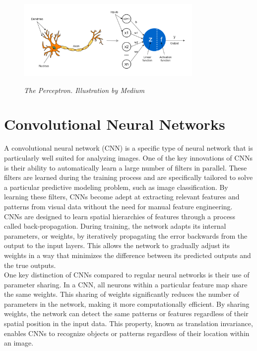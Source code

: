 \begin{figure}[H]
  \centering
  \includegraphics[width=0.8\textwidth]{imatges/preliminaries/perceptron.png}
  \caption[The Perceptron]{\textit{The Perceptron. Illustration by Medium}}
  {\label{fig:perceptron}}
\end{figure}

\newpage

\section{Convolutional Neural Networks}

A convolutional neural network (CNN) is a specific type of neural network that
is particularly well suited for analyzing images. One of the key innovations of
CNNs is their ability to automatically learn a large number of filters in
parallel. These filters are learned during the training process and are
specifically tailored to solve a particular predictive modeling problem, such
as image classification. By learning these filters, CNNs become adept at
extracting relevant features and patterns from visual data without the need for
manual feature engineering. \\

CNNs are designed to learn spatial hierarchies of features through a process
called back-propagation. During training, the network adapts its internal
parameters, or weights, by iteratively propagating the error backwards from the
output to the input layers. This allows the network to gradually adjust its
weights in a way that minimizes the difference between its predicted outputs
and the true outputs. \\

One key distinction of CNNs compared to regular neural networks is their use of
parameter sharing. In a CNN, all neurons within a particular feature map share
the same weights. This sharing of weights significantly reduces the number of
parameters in the network, making it more computationally efficient. By sharing
weights, the network can detect the same patterns or features regardless of
their spatial position in the input data. This property, known as translation
invariance, enables CNNs to recognize objects or patterns regardless of their
location within an image.\\

